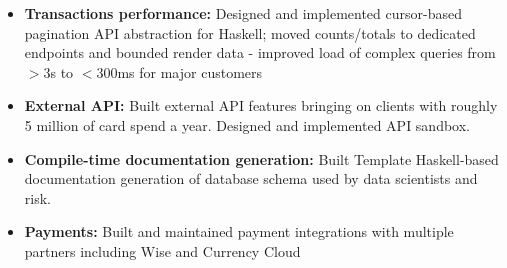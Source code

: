 \documentclass{simple_resume}
\begin{document}
\begin{itemize}
  \item \textbf{Transactions performance:} Designed and implemented cursor-based pagination API abstraction for Haskell; moved counts/totals to dedicated endpoints and bounded render data - improved load of complex queries from $>$3s to $<$300ms for major customers
  \item \textbf{External API:} Built external API features bringing on clients with roughly 5 million of card spend a year. Designed and implemented API sandbox.
  \item \textbf{Compile-time documentation generation:} Built Template Haskell-based documentation generation of database schema used by data scientists and risk.
  \item \textbf{Payments:} Built and maintained payment integrations with multiple partners including Wise and Currency Cloud
\end{itemize}


\end{document}
